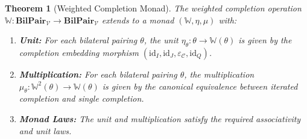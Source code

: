 \documentclass[11pt]{article}
\theoremstyle{plain}
\newtheorem{theorem}{Theorem}[section]
\theoremstyle{definition}
\theoremstyle{remark}
\newcommand{\V}{\mathcal{V}}
\newcommand{\C}{\mathcal{C}}
\newcommand{\id}{\mathrm{id}}
\begin{document}
\begin{theorem}[Weighted Completion Monad]\label{thm:completion-monad}
The weighted completion operation $\mathbb{W} : \mathbf{BilPair}_\V \to \mathbf{BilPair}_\V$ extends to a monad $(\mathbb{W}, \eta, \mu)$ with:

\begin{enumerate}
\item \textbf{Unit:} For each bilateral pairing $\theta$, the unit $\eta_\theta : \theta \to \mathbb{W}(\theta)$ is given by the completion embedding morphism $(\id_I, \id_J, \varepsilon_\C, \id_Q)$.

\item \textbf{Multiplication:} For each bilateral pairing $\theta$, the multiplication $\mu_\theta : \mathbb{W}^2(\theta) \to \mathbb{W}(\theta)$ is given by the canonical equivalence between iterated completion and single completion.

\item \textbf{Monad Laws:} The unit and multiplication satisfy the required associativity and unit laws.
\end{enumerate}
\end{theorem}
\end{document}
